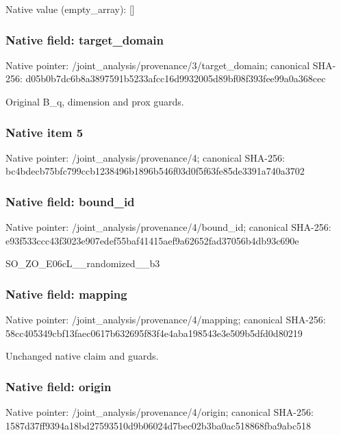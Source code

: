 \documentclass[10pt,a4paper]{article}
\begin{document}
Native value (empty\_array): []



\subsubsection{Native field: target\_domain}


Native pointer: /joint\_analysis/provenan\allowbreak{}ce/3/target\_domain; canonical SHA-256: d05b0b7dc6b8a3897591b523\allowbreak{}3afcc16d9932005d89bf08f3\allowbreak{}93fee99a0a368cec


Original B\_q, dimension and prox guards.


\subsubsection{Native item 5}


Native pointer: /joint\_analysis/provenance/4; canonical SHA-256: bc4bdecb75bfc799ccb12384\allowbreak{}96b1896b546f03d0f5f63fe8\allowbreak{}5de3391a740a3702



\subsubsection{Native field: bound\_id}


Native pointer: /joint\_analysis/provenance/4/bound\_id; canonical SHA-256: e93f533ccc43f3023e907ede\allowbreak{}f55baf41415aef9a62652fad\allowbreak{}37056b4db93c690e


SO\_ZO\_E06cL\_\_randomized\_\_b3


\subsubsection{Native field: mapping}


Native pointer: /joint\_analysis/provenance/4/mapping; canonical SHA-256: 58cc405349cbf13faec0617b\allowbreak{}632695f83f4e4aba198543e3\allowbreak{}e509b5dfd0d80219


Unchanged native claim and guards.


\subsubsection{Native field: origin}


Native pointer: /joint\_analysis/provenance/4/origin; canonical SHA-256: 1587d37ff9394a18bd275935\allowbreak{}10d9b06024d7bec02b3ba0ac\allowbreak{}518868fba9abc518
\end{document}
